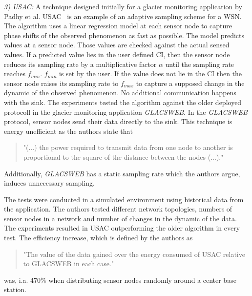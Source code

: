 \textit{3) \ac{USAC}:}
A technique designed initially for a glacier monitoring application by Padhy et
al. \ac{USAC}~\cite{padhy2006utility} is an example of an adaptive sampling
scheme for a \ac{WSN}. The algorithm uses a linear regression model at each
sensor node to capture phase shifts of the observed phenomenon as fast as
possible. The model predicts values at a sensor node. Those values are checked
against the actual sensed values. If a predicted value lies in the user defined
\ac{CI}, then the sensor node reduces its sampling rate by a multiplicative
factor $ \alpha $ until the sampling rate reaches $ f_{min} $. $ f_{min} $ is
set by the user. If the value does not lie in the \ac{CI} then the sensor node
raises its sampling rate to $ f_{max} $ to capture a supposed change in the
dynamic of the observed phenomenon. No additional communication happens with
the sink. The experiments tested the algorithm against the older deployed
protocoll in the glacier monitoring application \textit{GLACSWEB}. In the
\textit{GLACSWEB} protocol, sensor nodes send their data directly to the sink.
This technique is energy unefficient as the authors state that 

\begin{quotation}
    "(...) the power required to transmit data from one
    node to another is proportional to the square of the distance
    between the nodes (...)."
\end{quotation}

Additionally, \textit{GLACSWEB} has a static sampling rate which the authors
argue, induces unnecessary sampling.

The tests were conducted in a simulated environment using historical data from
the application. The authors tested different network topologies, numbers of
sensor nodes in a network and number of changes in the dynamic of the data. The
experiments resulted in \ac{USAC} outperforming the older algorithm in every
test. The efficiency increase, which is defined by the authors as

\begin{quotation}
    "The value of the data gained over the energy consumed of USAC relative to
    GLACSWEB in each case."
\end{quotation}


was, i.a. 470\% when distributing sensor nodes randomly around a center base
station.
\par


